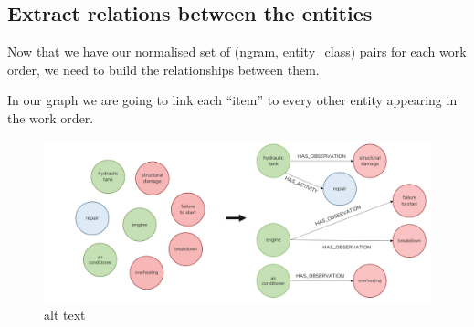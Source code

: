 \documentclass[11pt]{article}
\begin{document}
    \hypertarget{extract-relations-between-the-entities}{%
\subsection{Extract relations between the
entities}\label{extract-relations-between-the-entities}}

Now that we have our normalised set of (ngram, entity\_class) pairs for
each work order, we need to build the relationships between them.

In our graph we are going to link each ``item'' to every other entity
appearing in the work order.

\begin{figure}
\centering
\includegraphics{images/building-relations.png}
\caption{alt text}
\end{figure}
\end{document}
